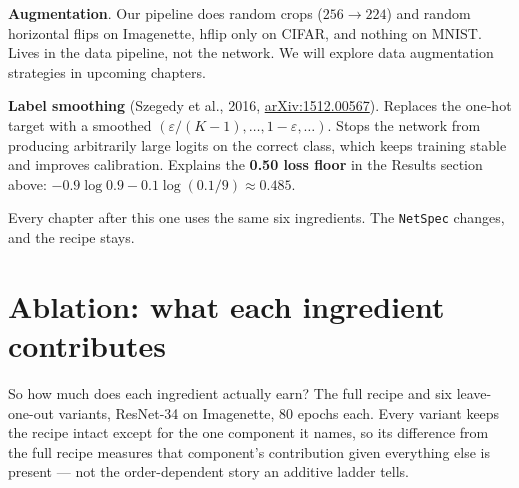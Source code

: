 \textbf{Augmentation}. Our pipeline does random crops ($256 \to 224$)
and random horizontal flips on Imagenette, hflip only on CIFAR, and
nothing on MNIST. Lives in the data pipeline, not the network. We
will explore data augmentation strategies in upcoming chapters.

\textbf{Label smoothing} (Szegedy et al., 2016,
\href{https://arxiv.org/abs/1512.00567}{arXiv:1512.00567}). Replaces
the one-hot
target with a smoothed $(\varepsilon / (K-1), \ldots, 1 - \varepsilon,
\ldots)$. Stops the network from producing arbitrarily large logits on
the correct class, which keeps training stable and improves calibration.
Explains the \textbf{0.50 loss floor} in the Results section above:
$-0.9 \log 0.9 - 0.1 \log (0.1/9) \approx 0.485$.

Every chapter after this one uses the same six ingredients. The
\texttt{NetSpec} changes, and the recipe stays.

\section{Ablation: what each ingredient contributes}
\label{sec:r34_ablation}

So how much does each ingredient actually earn? The full recipe and six
leave-one-out variants, ResNet-34 on Imagenette, 80 epochs each. Every variant
keeps the recipe intact except for the one component it names, so its
difference from the full recipe measures that component's contribution
given everything else is present --- not the order-dependent story an
additive ladder tells.


